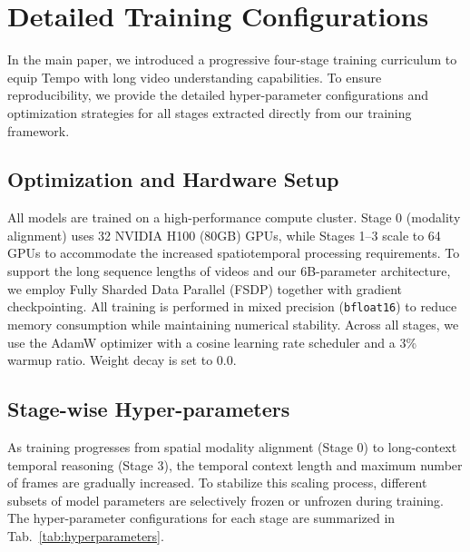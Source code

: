 \section{Detailed Training Configurations}
\label{supp:training_details}

In the main paper, we introduced a progressive four-stage training curriculum to equip Tempo with long video understanding capabilities. To ensure reproducibility, we provide the detailed hyper-parameter configurations and optimization strategies for all stages extracted directly from our training framework.

\subsection{Optimization and Hardware Setup}

All models are trained on a high-performance compute cluster. Stage 0 (modality alignment) uses 32 NVIDIA H100 (80GB) GPUs, while Stages 1--3 scale to 64 GPUs to accommodate the increased spatiotemporal processing requirements. To support the long sequence lengths of videos and our 6B-parameter architecture, we employ Fully Sharded Data Parallel (FSDP) together with gradient checkpointing. All training is performed in mixed precision (\texttt{bfloat16}) to reduce memory consumption while maintaining numerical stability.
%
Across all stages, we use the AdamW optimizer with a cosine learning rate scheduler and a 3\% warmup ratio. Weight decay is set to 0.0.

\subsection{Stage-wise Hyper-parameters}

As training progresses from spatial modality alignment (Stage 0) to long-context temporal reasoning (Stage 3), the temporal context length and maximum number of frames are gradually increased. To stabilize this scaling process, different subsets of model parameters are selectively frozen or unfrozen during training. The hyper-parameter configurations for each stage are summarized in Tab.~\ref{tab:hyperparameters}.


